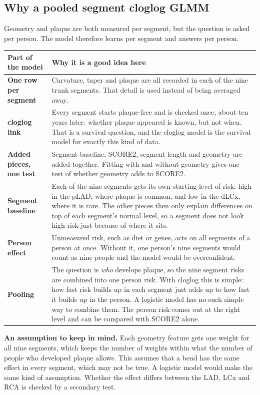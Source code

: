 \documentclass[11pt,a4paper]{article}
\begin{document}
\sloppy

\subsection*{Why a pooled segment cloglog GLMM}
Geometry and plaque are both measured per segment, but the question is asked per person. The model
therefore learns per segment and answers per person.

\begin{tabularx}{\textwidth}{@{}>{\raggedright\arraybackslash\bfseries}p{3.6cm}X@{}}
\toprule
\textbf{Part of the model} & \textbf{Why it is a good idea here} \\
\midrule
One row per segment & Curvature, taper and plaque are all recorded in each of the nine trunk
  segments. That detail is used instead of being averaged away. \\
cloglog link & Every segment starts plaque-free and is checked once, about ten years later: whether
  plaque appeared is known, but not when. That is a survival question, and the cloglog model is the
  survival model for exactly this kind of data. \\
Added pieces, one test & Segment baseline, SCORE2, segment length and geometry are added together.
  Fitting with and without geometry gives one test of whether geometry adds to SCORE2. \\
Segment baseline & Each of the nine segments gets its
  own starting level of risk: high in the pLAD, where plaque is common, and low in the dLCx, where it is
  rare. The other pieces then only explain differences on top of each segment's normal level, so a
  segment does not look high-risk just because of where it sits. \\
Person effect & Unmeasured risk, such as diet or genes, acts on all segments of a person at once.
  Without it, one person's nine segments would count as nine people and the model would be
  overconfident. \\
Pooling & The question is \emph{who} develops plaque, so the nine segment risks are combined into one
  person risk. With cloglog this is simple: how fast risk builds up in each segment just adds up to how fast it builds up in the person. A
  logistic model has no such simple way to combine them. The person risk comes out at the right level
  and can be compared with SCORE2 alone. \\
\bottomrule
\end{tabularx}

\textbf{An assumption to keep in mind.} Each geometry feature gets one weight for all nine segments,
which keeps the number of weights within what the number of people who developed plaque allows. This
assumes that a bend has the same effect in every segment, which may not be true. A logistic model
would make the same kind of assumption. Whether the effect differs between the LAD, LCx and RCA is
checked by a secondary test.
\end{document}
